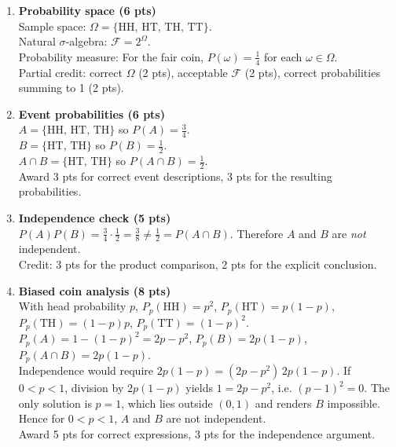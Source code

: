 \documentclass[11pt]{article}
\begin{document}
\begin{enumerate}
  \item \textbf{Probability space (6 pts)}\\
  Sample space: $\Omega = \{\mathrm{HH},\, \mathrm{HT},\, \mathrm{TH},\, \mathrm{TT}\}$.\\
  Natural $\sigma$-algebra: $\mathcal{F} = 2^{\Omega}$.\\
  Probability measure: For the fair coin, $P(\omega) = \tfrac{1}{4}$ for each $\omega \in \Omega$.\\
  Partial credit: correct $\Omega$ (2 pts), acceptable $\mathcal{F}$ (2 pts), correct probabilities summing to 1 (2 pts).

  \item \textbf{Event probabilities (6 pts)}\\
  $A = \{\mathrm{HH},\, \mathrm{HT},\, \mathrm{TH}\}$ so $P(A) = \tfrac{3}{4}$.\\
  $B = \{\mathrm{HT},\, \mathrm{TH}\}$ so $P(B) = \tfrac{1}{2}$.\\
  $A \cap B = \{\mathrm{HT},\, \mathrm{TH}\}$ so $P(A \cap B) = \tfrac{1}{2}$.\\
  Award 3 pts for correct event descriptions, 3 pts for the resulting probabilities.

  \item \textbf{Independence check (5 pts)}\\
  $P(A)P(B) = \tfrac{3}{4} \cdot \tfrac{1}{2} = \tfrac{3}{8} \neq \tfrac{1}{2} = P(A \cap B)$. Therefore $A$ and $B$ are \emph{not} independent.\\
  Credit: 3 pts for the product comparison, 2 pts for the explicit conclusion.

  \item \textbf{Biased coin analysis (8 pts)}\\
  With head probability $p$, $P_p(\mathrm{HH}) = p^2$, $P_p(\mathrm{HT}) = p(1-p)$, $P_p(\mathrm{TH}) = (1-p)p$, $P_p(\mathrm{TT}) = (1-p)^2$.\\
  $P_p(A) = 1 - (1-p)^2 = 2p - p^2$, \quad $P_p(B) = 2p(1-p)$, \quad $P_p(A \cap B) = 2p(1-p)$.\\
  Independence would require $2p(1-p) = (2p - p^2)\,2p(1-p)$. If $0<p<1$, division by $2p(1-p)$ yields $1 = 2p - p^2$, i.e. $(p-1)^2 = 0$. The only solution is $p=1$, which lies outside $(0,1)$ and renders $B$ impossible. Hence for $0<p<1$, $A$ and $B$ are not independent.\\
  Award 5 pts for correct expressions, 3 pts for the independence argument.
\end{enumerate}
\end{document}
